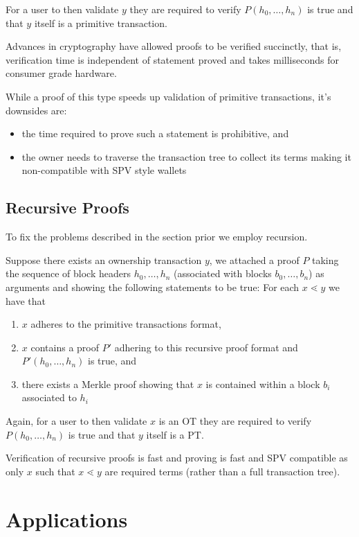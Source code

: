 \documentclass[9pt,oneside]{amsart}
\begin{document}
For a user to then validate $y$ they are required to verify $P(h_{0}, \dots, h_{n})$ is true and that $y$ itself is a primitive transaction.

Advances in cryptography have allowed proofs to be verified succinctly, that is, verification time is independent of statement proved and takes milliseconds for consumer grade hardware.

While a proof of this type speeds up validation of primitive transactions, it's downsides are:
\begin{itemize}
    \item the time required to prove such a statement is prohibitive, and
    \item the owner needs to traverse the transaction tree to collect its terms making it non-compatible with SPV style wallets
\end{itemize}

\subsection{Recursive Proofs}
To fix the problems described in the section prior we employ recursion. 

Suppose there exists an ownership transaction $y$, we attached a proof $P$ taking the sequence of block headers $h_{0}, \dots, h_{n}$ (associated with blocks $b_{0}, \dots, b_{n}$) as arguments and showing the following statements to be true:
For each $x \lessdot y$ we have that
\begin{enumerate}
    \item $x$ adheres to the primitive transactions format,
    \item $x$ contains a proof $P'$ adhering to this recursive proof format and $P'(h_{0}, \dots, h_{n})$ is true, and
    \item there exists a Merkle proof showing that $x$ is contained within a block $b_{i}$ associated to $h_{i}$
\end{enumerate}

Again, for a user to then validate $x$ is an OT they are required to verify $P(h_{0}, \dots, h_{n})$ is true and that $y$ itself is a PT.

Verification of recursive proofs is fast and proving is fast and SPV compatible as only $x$ such that $x \lessdot y$ are required terms (rather than a full transaction tree).

\section{Applications}
\end{document}
